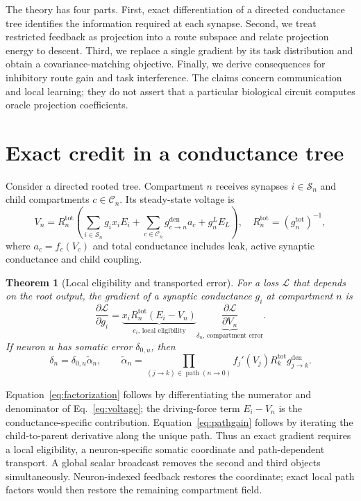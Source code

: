 \documentclass[11pt]{article}
\newtheorem{theorem}{Theorem}
\begin{document}
The theory has four parts. First, exact differentiation of a directed
conductance tree identifies the information required at each synapse. Second,
we treat restricted feedback as projection into a route subspace and relate
projection energy to descent. Third, we replace a single gradient by its task
distribution and obtain a covariance-matching objective. Finally, we derive
consequences for inhibitory route gain and task interference. The claims
concern communication and local learning; they do not
assert that a particular biological circuit computes oracle projection
coefficients.

\section{Exact credit in a conductance tree}

Consider a directed rooted tree. Compartment $n$ receives synapses
$i\in\mathcal S_n$ and child compartments $c\in\mathcal C_n$. Its steady-state
voltage is
\begin{equation}
V_n=R_n^{\mathrm{tot}}
\left(\sum_{i\in\mathcal S_n}g_i x_iE_i+
\sum_{c\in\mathcal C_n}g_{c\to n}^{\mathrm{den}}a_c+g_n^LE_L\right),
\quad
R_n^{\mathrm{tot}}=(g_n^{\mathrm{tot}})^{-1},
\label{eq:voltage}
\end{equation}
where $a_c=f_c(V_c)$ and total conductance includes leak, active synaptic
conductance and child coupling.

\begin{theorem}[Local eligibility and transported error]
For a loss $\mathcal L$ that depends on the root output, the gradient of a
synaptic conductance $g_i$ at compartment $n$ is
\begin{equation}
\frac{\partial\mathcal L}{\partial g_i}
=\underbrace{x_iR_n^{\mathrm{tot}}(E_i-V_n)}_{e_i\text{, local eligibility}}
\underbrace{\frac{\partial\mathcal L}{\partial V_n}}_{\delta_n\text{, compartment error}}.
\label{eq:factorization}
\end{equation}
If neuron $u$ has somatic error $\delta_{0,u}$, then
\begin{equation}
\delta_n=\delta_{0,u}\widetilde\alpha_n,
\qquad
\widetilde\alpha_n=
\prod_{(j\to k)\in\operatorname{path}(n\to0)}
f_j'(V_j)R_k^{\mathrm{tot}}g_{j\to k}^{\mathrm{den}}.
\label{eq:pathgain}
\end{equation}
\end{theorem}

Equation~\ref{eq:factorization} follows by differentiating the numerator and
denominator of Eq.~\ref{eq:voltage}; the driving-force term $E_i-V_n$ is the
conductance-specific contribution. Equation~\ref{eq:pathgain} follows by
iterating the child-to-parent derivative along the unique path. Thus an exact
gradient requires a local eligibility, a neuron-specific somatic coordinate
and path-dependent transport. A global scalar broadcast removes the second and
third objects simultaneously. Neuron-indexed feedback restores the coordinate;
exact local path factors would then restore the remaining compartment field.
\end{document}
